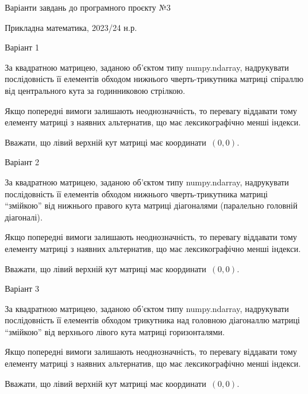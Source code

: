 \documentclass[11pt]{article}
\begin{document}
{\Large \center  Варіанти завдань до програмного проєкту №3\par Прикладна математика, 2023/24 н.р.\par \bigskip\bigskip}

{\Large \center  Варіант  1\par \bigskip\bigskip}

За квадратною матрицею, заданою об'єктом типу numpy.ndarray, надрукувати послідовність її елементів обходом нижнього чверть-трикутника матриці спіраллю від центрального кута за годинниковою стрілкою.

\vspace{2mm}
Якщо попередні вимоги залишають неоднозначність, то перевагу віддавати тому елементу матриці з наявних альтернатив, що має лексикографічно менші індекси.

Вважати, що лівий верхній кут матриці має координати~$(0,0)$.



{\Large \center  Варіант  2\par \bigskip\bigskip}

За квадратною матрицею, заданою об'єктом типу numpy.ndarray, надрукувати послідовність її елементів обходом нижнього чверть-трикутника матриці ``змійкою'' від нижнього правого кута матриці діагоналями (паралельно головній діагоналі).

\vspace{2mm}
Якщо попередні вимоги залишають неоднозначність, то перевагу віддавати тому елементу матриці з наявних альтернатив, що має лексикографічно менші індекси.

Вважати, що лівий верхній кут матриці має координати~$(0,0)$.



{\Large \center  Варіант  3\par \bigskip\bigskip}

За квадратною матрицею, заданою об'єктом типу numpy.ndarray, надрукувати послідовність її елементів обходом трикутника над головною діагоналлю матриці ``змійкою'' від верхнього лівого кута матриці горизонталями.

\vspace{2mm}
Якщо попередні вимоги залишають неоднозначність, то перевагу віддавати тому елементу матриці з наявних альтернатив, що має лексикографічно менші індекси.

Вважати, що лівий верхній кут матриці має координати~$(0,0)$.
\end{document}
